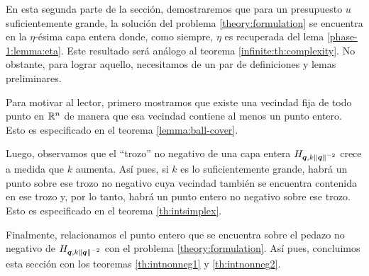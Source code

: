 En esta segunda parte de la sección, demostraremos que para un presupuesto $u$ suficientemente
grande, la solución del problema \eqref{theory:formulation} se encuentra en la $\eta$-ésima capa
entera donde, como siempre, $\eta$ es recuperada del lema \ref{phase-1:lemma:eta}. Este resultado
será análogo al teorema \ref{infinite:th:complexity}. No obstante, para lograr aquello, necesitamos
de un par de definiciones y lemas preliminares.

Para motivar al lector, primero mostramos que existe una vecindad fija de todo punto en $\mathbb{R}^n$ de
manera que esa vecindad contiene al menos un punto entero. Esto es especificado en el teorema
\ref{lemma:ball-cover}.

Luego, observamos que el ``trozo'' no negativo de una capa entera $H_{\boldsymbol{q},
k\left\lVert \boldsymbol{q} \right\rVert^{-2}}$ crece a medida que $k$ aumenta. Así pues, si $k$ es lo suficientemente
grande, habrá un punto sobre ese trozo no negativo cuya vecindad también se encuentra contenida en
ese trozo y, por lo tanto, habrá un punto entero no negativo sobre ese trozo. Esto es especificado
en el teorema \ref{th:intsimplex}.

Finalmente, relacionamos el punto entero que se encuentra sobre el pedazo no negativo de
$H_{\boldsymbol{q}, k\left\lVert \boldsymbol{q} \right\rVert^{-2}}$ con el problema \eqref{theory:formulation}. Así pues, concluimos
esta sección con los teoremas \ref{th:intnonneg1} y \ref{th:intnonneg2}.


